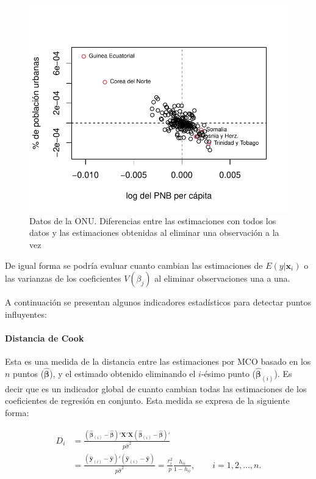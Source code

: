 \documentclass[
]{article}
\begin{document}
\begin{figure}

{\centering \includegraphics{MLG1_files/figure-latex/Un11valAtipElim-1} 

}

\caption{Datos de la ONU. Diferencias entre las estimaciones con todos los datos y las estimaciones obtenidas al eliminar una observación a la vez}\label{fig:Un11valAtipElim}
\end{figure}

De igual forma se podría evaluar cuanto cambian las estimaciones de \(E(y|\boldsymbol x_{i})\) o las varianzas de los coeficientes \(V(\beta_{j})\) al eliminar observaciones una a una.

A continuación se presentan algunos indicadores estadísticos para detectar puntos influyentes:

\hypertarget{distancia-de-cook}{%
\paragraph{Distancia de Cook}\label{distancia-de-cook}}

Esta es una medida de la distancia entre las estimaciones por MCO basado en los \(n\) puntos (\(\hat{\boldsymbol \beta}\)), y el estimado obtenido eliminando el \(i\)-ésimo punto (\(\hat{\boldsymbol \beta}_{(i)}\)). Es decir que es un indicador global de cuanto cambian todas las estimaciones de los coeficientes de regresión en conjunto. Esta medida se expresa de la siguiente forma:

\begin{equation}
\begin{split}
D_{i} &= \frac{(\hat{\boldsymbol \beta}_{(i)}-\hat{\boldsymbol \beta})'\boldsymbol X'\boldsymbol X(\hat{\boldsymbol \beta}_{(i)}-\hat{\boldsymbol \beta})'}{p \hat{\sigma}^{2}}   \\
      &= \frac{(\hat{\boldsymbol y}_{(i)} - \hat{\boldsymbol y} )'(\hat{\boldsymbol y}_{(i)} - \hat{\boldsymbol y} )}{p\hat{\sigma}^{2}} = \frac{r_{i}^{2}}{p}\frac{h_{ii}}{1-h_{ii}}, \qquad i=1,2,\ldots,n.
\end{split} \nonumber
\end{equation}
\end{document}
